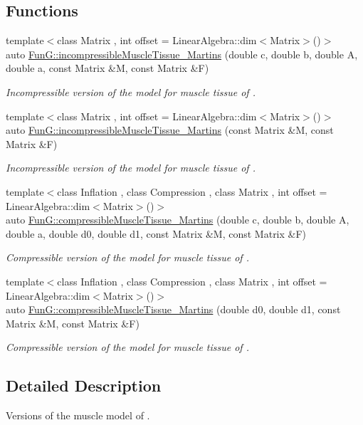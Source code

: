 \subsection*{Functions}
\begin{DoxyCompactItemize}
\item 
{\footnotesize template$<$class Matrix , int offset = Linear\+Algebra\+::dim$<$\+Matrix$>$()$>$ }\\auto \hyperlink{group__Biomechanics_gafcc36a1958899ca9246c4c1b3c9bfd85}{Fun\+G\+::incompressible\+Muscle\+Tissue\+\_\+\+Martins} (double c, double b, double A, double a, const Matrix \&M, const Matrix \&F)
\begin{DoxyCompactList}\small\item\em Incompressible version of the model for muscle tissue of \cite{Martins1998}. \end{DoxyCompactList}\item 
{\footnotesize template$<$class Matrix , int offset = Linear\+Algebra\+::dim$<$\+Matrix$>$()$>$ }\\auto \hyperlink{group__Biomechanics_ga9e414585a90b1988e9fa88d17d875055}{Fun\+G\+::incompressible\+Muscle\+Tissue\+\_\+\+Martins} (const Matrix \&M, const Matrix \&F)
\begin{DoxyCompactList}\small\item\em Incompressible version of the model for muscle tissue of \cite{Martins1998}. \end{DoxyCompactList}\item 
{\footnotesize template$<$class Inflation , class Compression , class Matrix , int offset = Linear\+Algebra\+::dim$<$\+Matrix$>$()$>$ }\\auto \hyperlink{group__Biomechanics_gad831914c493a3da04ed40c3c0ce87a62}{Fun\+G\+::compressible\+Muscle\+Tissue\+\_\+\+Martins} (double c, double b, double A, double a, double d0, double d1, const Matrix \&M, const Matrix \&F)
\begin{DoxyCompactList}\small\item\em Compressible version of the model for muscle tissue of \cite{Martins1998}. \end{DoxyCompactList}\item 
{\footnotesize template$<$class Inflation , class Compression , class Matrix , int offset = Linear\+Algebra\+::dim$<$\+Matrix$>$()$>$ }\\auto \hyperlink{group__Biomechanics_ga46a70ccb2285e12addad87b6a8aaaae8}{Fun\+G\+::compressible\+Muscle\+Tissue\+\_\+\+Martins} (double d0, double d1, const Matrix \&M, const Matrix \&F)
\begin{DoxyCompactList}\small\item\em Compressible version of the model for muscle tissue of \cite{Martins1998}. \end{DoxyCompactList}\end{DoxyCompactItemize}


\subsection{Detailed Description}
Versions of the muscle model of \cite{Martins1998}. 

